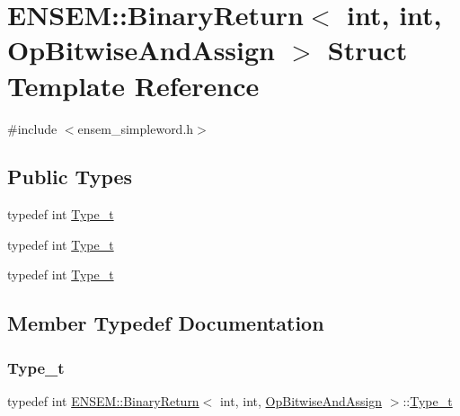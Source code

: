 \hypertarget{structENSEM_1_1BinaryReturn_3_01int_00_01int_00_01OpBitwiseAndAssign_01_4}{}\section{E\+N\+S\+EM\+:\+:Binary\+Return$<$ int, int, Op\+Bitwise\+And\+Assign $>$ Struct Template Reference}
\label{structENSEM_1_1BinaryReturn_3_01int_00_01int_00_01OpBitwiseAndAssign_01_4}


{\ttfamily \#include $<$ensem\+\_\+simpleword.\+h$>$}

\subsection*{Public Types}
\begin{DoxyCompactItemize}
\item 
typedef int \mbox{\hyperlink{structENSEM_1_1BinaryReturn_3_01int_00_01int_00_01OpBitwiseAndAssign_01_4_a0dd17e33f27d41964bcaa781f8d58aca}{Type\+\_\+t}}
\item 
typedef int \mbox{\hyperlink{structENSEM_1_1BinaryReturn_3_01int_00_01int_00_01OpBitwiseAndAssign_01_4_a0dd17e33f27d41964bcaa781f8d58aca}{Type\+\_\+t}}
\item 
typedef int \mbox{\hyperlink{structENSEM_1_1BinaryReturn_3_01int_00_01int_00_01OpBitwiseAndAssign_01_4_a0dd17e33f27d41964bcaa781f8d58aca}{Type\+\_\+t}}
\end{DoxyCompactItemize}


\subsection{Member Typedef Documentation}
\mbox{\label{structENSEM_1_1BinaryReturn_3_01int_00_01int_00_01OpBitwiseAndAssign_01_4_a0dd17e33f27d41964bcaa781f8d58aca}} 
\subsubsection{\texorpdfstring{Type\_t}{Type\_t}\hspace{0.1cm}{\footnotesize\ttfamily [1/3]}}
{\footnotesize\ttfamily typedef int \mbox{\hyperlink{structENSEM_1_1BinaryReturn}{E\+N\+S\+E\+M\+::\+Binary\+Return}}$<$ int, int, \mbox{\hyperlink{structENSEM_1_1OpBitwiseAndAssign}{Op\+Bitwise\+And\+Assign}} $>$\+::\mbox{\hyperlink{structENSEM_1_1BinaryReturn_3_01int_00_01int_00_01OpBitwiseAndAssign_01_4_a0dd17e33f27d41964bcaa781f8d58aca}{Type\+\_\+t}}}

